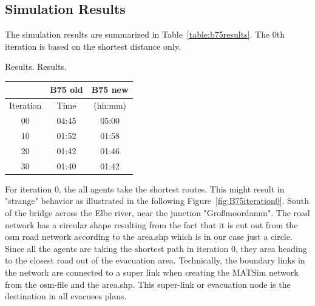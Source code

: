 \subsection{Simulation Results}

The simulation results are summarized in Table~\ref{table:b75results}. The 0th iteration is based on the shortest distance only. 

\createtable%
{Results.}%
{Results.}%
{\label{table:b75results}}%
{%
\begin{tabular}{|c|c|c|}
	\hline \rule[-2ex]{0pt}{5.5ex}  & B75 old & B75 new \\ 
	\hline \rule[-2ex]{0pt}{5.5ex}  Iteration & Time &  (hh:mm) \\ 
	\hline \rule[-2ex]{0pt}{5.5ex}  00 & 04:45 &  05:00\\ 
	\hline \rule[-2ex]{0pt}{5.5ex}  10 & 01:52 &  01:58\\ 
	\hline \rule[-2ex]{0pt}{5.5ex}  20 & 01:42 &  01:46\\ 
	\hline \rule[-2ex]{0pt}{5.5ex}  30 & 01:40 &  01:42\\ 
	\hline 
\end{tabular}
}%
{}%

For iteration 0, the all agents take the shortest routes. This might result in "strange" behavior as illustrated in the following Figure~\ref{fig:B75iteration0}.
South of the bridge across the Elbe river, near the junction "Gro{\ss}moordamm". The road network has a circular shape resulting from the fact that it is cut out from the osm road network according to the area.shp which is in our case just a circle. Since all the agents are taking the shortest path in iteration 0, they area heading to the closest road out of the evacuation area. Technically, the boundary links in the network are connected to a super link when creating the MATSim network from the osm-file and the area.shp. This super-link or evacuation node is the destination in all evacuees plans. 

